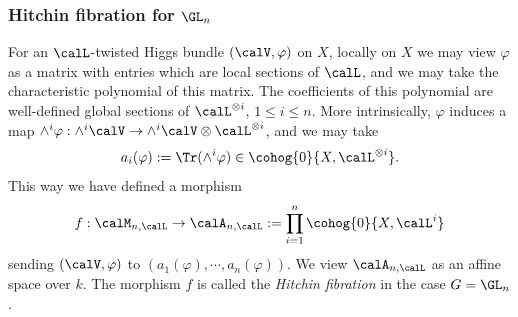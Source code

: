 \subsubsection{Hitchin fibration for $\GL_{n}$}
For an $\calL$-twisted Higgs bundle $(\calV,\varphi)$ on $X$, locally on $X$ we may view $\varphi$ as a matrix with entries which are local sections of $\calL$, and we may take the characteristic polynomial of this matrix. The coefficients of this polynomial are well-defined global sections of $\calL^{\otimes i}$, $1\leq i\leq n$. More intrinsically, $\varphi$ induces a map $\wedge^{i}\varphi:\wedge^{i}\calV\to\wedge^{i}\calV\otimes\calL^{\otimes i}$, and we may take 
\begin{equation*}
a_{i}(\varphi):=\Tr(\wedge^{i}\varphi)\in\cohog{0}{X,\calL^{\otimes i}}.
\end{equation*}
This way we have defined a morphism
\begin{equation*}
f: \calM_{n,\calL}\to\calA_{n,\calL}:=\prod_{i=1}^{n}\cohog{0}{X,\calL^{i}}
\end{equation*}
sending $(\calV,\varphi)$ to $(a_{1}(\varphi),\cdots, a_{n}(\varphi))$. We view $\calA_{n,\calL}$ as an affine space over $k$. The morphism $f$ is called the {\em Hitchin fibration} in the case $G=\GL_{n}$.


